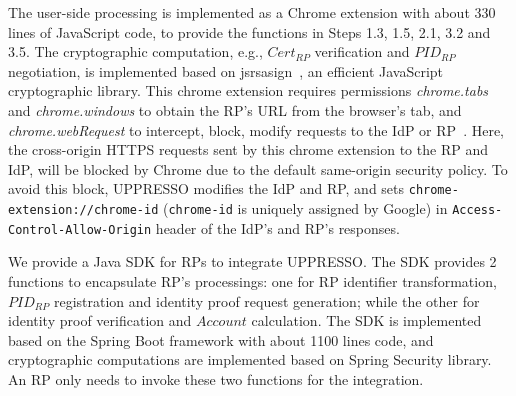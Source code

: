 The user-side processing is implemented as a Chrome extension with about 330 lines of JavaScript code, to provide the functions in Steps 1.3, 1.5, 2.1, 3.2 and 3.5.
The cryptographic computation, e.g., $Cert_{RP}$ verification and $PID_{RP}$ negotiation, is implemented based on jsrsasign~\cite{jsrsasign}, an efficient JavaScript cryptographic library.
This chrome extension requires permissions  \emph{chrome.tabs} and \emph{chrome.windows} to obtain the RP's URL from the browser's tab,  and \emph{chrome.webRequest} to intercept, block, modify requests to the IdP or RP~\cite{chromeExtension}.
Here, the cross-origin HTTPS requests sent by this chrome extension to the RP and IdP, will be blocked by Chrome due to the default same-origin security policy.
To avoid this block, UPPRESSO modifies the IdP and RP, and sets \verb+chrome-extension://chrome-id+ (\verb+chrome-id+ is uniquely assigned by Google) in \verb+Access-Control-Allow-Origin+ header of the IdP's and RP's responses.

We provide a Java SDK for RPs to integrate UPPRESSO.
The SDK provides 2 functions to encapsulate RP's processings: one for  RP identifier transformation, $PID_{RP}$ registration and identity proof request generation; while the other for identity proof verification and $Account$ calculation. %
The SDK is implemented based on the Spring Boot framework  with about 1100 lines code, and cryptographic computations are implemented based on Spring Security library.
An RP only needs to invoke these two functions for the integration.


